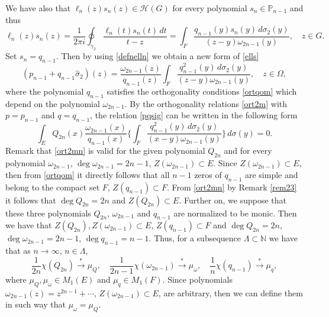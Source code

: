 \documentclass[11pt, a4paper, twoside]{article}
\let\myh\widehat
\def\NN{\mathbb N}
\def\PP{\mathbb P}
\def\HH{\mathscr H}
\def\mdeg{\operatorname{deg}}
\theoremstyle{plain}
\theoremstyle{definition}
\begin{document}
We have also that $\ell_n(z)s_n(z)\in\HH(G)$ for every polynomial $s_n\in\PP_{n-1}$ and thus
\begin{equation}
\ell_n(z)s_n(z)=\frac1{2\pi i}
\oint_{\gamma_2 }\frac{\ell_n(t)s_n(t)\,dt}{t-z}
=\int_F\frac{q_{n-1}(y)s_n(y)\,d\sigma_2(y)}{(z-y)\omega_{2n-1}(y)},
\quad z\in G.
\label{ells}
\end{equation}
Set $s_n=q_{n-1}$. Then by using \eqref{defnelln} we obtain a new form of \eqref{ells}
\begin{equation}
(p_{n-1}+q_{n-1}\myh{\sigma}_2)(z)
=\frac{\omega_{2n-1}(z)}{q_{n-1}(z)}
\int_F\frac{q_{n-1}^2(y)\,d\sigma_2(y)}{(z-y)\omega_{2n-1}(y)},
\quad z\in\Omega,
\label{pqsig}
\end{equation}
where the polynomial $q_{n-1}$ satisfies the orthogonality conditions \eqref{ortqom} which depend on the polynomial $\omega_{2n-1}$.
By the orthogonality relations \eqref{ort2m} with $p=p_{n-1}$ and $q=q_{n-1}$, the relation \eqref{pqsig} can be written in the following form
\begin{equation}
\int_E Q_{2n}(x)\frac{\omega_{2n-1}(x)}{q_{n-1}(x)}
\biggl\{
\int_F \frac{q_{n-1}^2(y)\,d\sigma_2(y)}{(x-y)\omega_{2n-1}(y)}
\biggr\}\,d\sigma(y)=0.
\label{ort2mn}
\end{equation}
Remark that \eqref{ort2mn} is valid for the given polynomial $Q_{2n}$ and for every polynomial $\omega_{2n-1}$, $\mdeg{\omega_{2n-1}}=2n-1$,  $Z(\omega_{2n-1})\subset E$.  Since $Z(\omega_{2n-1})\subset E$, then from \eqref{ortqom} it directly follows that all  $n-1$ zeros of $q_{n-1}$ are simple and belong to the compact set $F$, $Z(q_{n-1})\subset F$.  
From \eqref{ort2mn} by Remark \ref{rem23} it follows that $\mdeg{Q_{2n}}=2n$  and $Z(Q_{2n})\subset E$.
Further on, we suppose that these three polynomials $Q_{2n}$, $\omega_{2n-1}$ and $q_{n-1}$ are normalized  to be monic. 
Then we have that $Z(Q_{2n}),Z(\omega_{2n-1})\subset{E}$, $Z(q_{n-1})\subset{F}$ and $\mdeg{Q_{2n}}=2n$,  $\mdeg{\omega_{2n-1}}=2n-1$, $\mdeg{q_{n-1}}=n-1$. Thus, for a subsequence $\Lambda\subset\NN$ we have that as $n\to\infty$, $n\in\Lambda$,
\begin{equation}
\frac1{2n}\chi(Q_{2n}){\overset{*}\longrightarrow}\mu_Q,\quad
\frac1{2n-1}\chi(\omega_{2n-1}){\overset{*}\longrightarrow}\mu_\omega, \quad
\frac1n\chi(q_{n-1})
 \overset{*}\longrightarrow \mu_q,
\label{limpols}
\end{equation}
where $\mu_Q,\mu_\omega\in M_1(E)$ and $\mu_q\in M_1(F)$.
Since polynomials $\omega_{2n-1}(z)=z^{2n-1}+\dotsb$, $Z(\omega_{2n-1})\subset E$, are arbitrary,
then we can define them in such way that $\mu_\omega=\mu_Q$.
\end{document}
